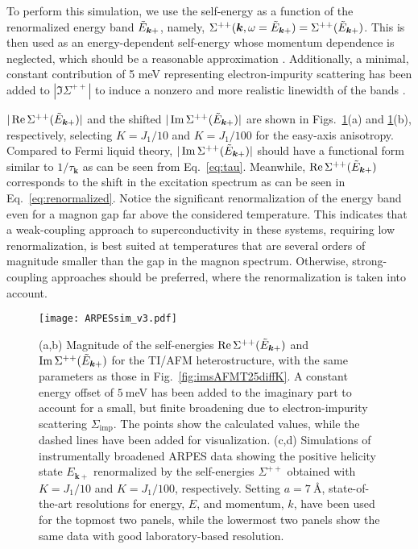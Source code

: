 \documentclass[aps, prb, twocolumn,amsmath,amssymb,floatfix]{revtex4-2}
\begin{document}
To perform this simulation, we use the self-energy as a function of the renormalized energy band $\Tilde{E}_{\boldsymbol{k}+}$, namely, $\Sigma^{++}(\boldsymbol{k}, \omega = \Tilde{E}_{\boldsymbol{k}+}) = \Sigma^{++}(\Tilde{E}_{\boldsymbol{k}+})$. This is then used as an energy-dependent self-energy whose momentum dependence is neglected, which should be a reasonable approximation \cite{Pletikosic2012finding}. Additionally, a minimal, constant contribution of 5 meV representing electron-impurity scattering has been added to $|\Im\Sigma^{++}|$ to induce a nonzero and more realistic linewidth of the bands \cite{bostwick2007quasiparticle,Bianchi2010electron}.

$|\Re\Sigma^{++}(\Tilde{E}_{\boldsymbol{k}+})|$ and the shifted $|\Im\Sigma^{++}(\Tilde{E}_{\boldsymbol{k}+})|$ are shown in Figs.~\ref{fig:ARPESsim}(a) and \ref{fig:ARPESsim}(b), respectively, selecting $K=J_{1}/10$ and $K=J_{1}/100$ for the easy-axis anisotropy. Compared to Fermi liquid theory, $|\Im\Sigma^{++}(\Tilde{E}_{\boldsymbol{k}+})|$ should have a functional form similar to $1/\tau_{\boldsymbol{k}}$ as can be seen from Eq.~\eqref{eq:tau}. Meanwhile, $\Re\Sigma^{++}(\Tilde{E}_{\boldsymbol{k}+})$ corresponds to the shift in the excitation spectrum as can be seen in Eq.~\eqref{eq:renormalized}. Notice the significant renormalization of the energy band even for a magnon gap far above the considered temperature. This indicates that a weak-coupling approach to superconductivity in these systems, requiring low renormalization, is best suited at temperatures that are several orders of magnitude smaller than the gap in the magnon spectrum. Otherwise, strong-coupling approaches should be preferred, where the renormalization is taken into account.

\begin{figure}
    \centering
    \texttt{[image: ARPESsim\_v3.pdf]}
    \caption{(a,b) Magnitude of the self-energies $\Re\Sigma^{++}(\Tilde{E}_{\boldsymbol{k}+})$ and $\Im\Sigma^{++}(\Tilde{E}_{\boldsymbol{k}+})$ for the TI/AFM heterostructure, with the same parameters as those in Fig.~\ref{fig:imsAFMT25diffK}. A constant energy offset of $5~$meV has been added to the imaginary part to account for a small, but finite broadening due to electron-impurity scattering $\Sigma_{\text{imp}}$. The points show the calculated values, while the dashed lines have been added for visualization. (c,d) Simulations of instrumentally broadened ARPES data showing the positive helicity state $E_{\boldsymbol{k}+}$ renormalized by the self-energies $\Sigma^{++}$ obtained with $K=J_{1}/10$ and $K=J_{1}/100$, respectively. Setting $a = 7~${\AA}, state-of-the-art resolutions for energy, $E$, and momentum, $k$, have been used for the topmost two panels, while the lowermost two panels show the same data with good laboratory-based resolution.}
    \label{fig:ARPESsim}
\end{figure}
\end{document}
